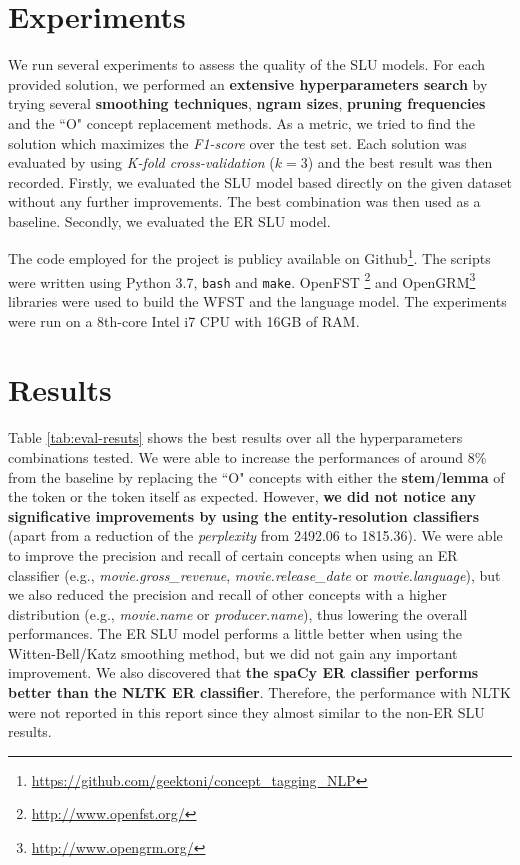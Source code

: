 \documentclass[11pt,a4paper]{article}
\begin{document}
\section{Experiments}

We run several experiments to assess the quality of 
the SLU models. For each provided solution, we performed an \textbf{extensive hyperparameters search} by trying several \textbf{smoothing techniques}, \textbf{ngram sizes}, \textbf{pruning frequencies} and the ``O" concept replacement methods. As a metric, we tried to find the solution which maximizes the \textit{F1-score} over the test set. Each solution was evaluated by using \textit{K-fold cross-validation} ($k=3$) and the best result was then recorded. Firstly, we evaluated the SLU model based directly on the given dataset without any further improvements. The best combination was then used as a baseline. Secondly, we evaluated the ER SLU model. 

The code employed for the project is publicy available on Github\footnote{\url{https://github.com/geektoni/concept\_tagging\_NLP}}. The scripts were written using Python 3.7, \texttt{bash} and \texttt{make}. OpenFST \footnote{\url{http://www.openfst.org/}} and OpenGRM\footnote{\url{http://www.opengrm.org/}} libraries were used to build the WFST and the language model.
The experiments were run on a 8th-core Intel i7 CPU with 16GB of RAM. 



\section{Results}

Table \ref{tab:eval-resuts} shows the best results over all the hyperparameters combinations tested. We were able to increase the performances of around 8\% from the baseline by replacing the ``O" concepts with either the \textbf{stem}/\textbf{lemma} of the token or the token itself as expected.
However, \textbf{we did not notice any significative improvements by using the entity-resolution classifiers} (apart from a reduction of the \textit{perplexity} from 2492.06 to 1815.36).  We were able to improve the precision and recall of certain concepts when using an ER classifier (e.g., \textit{movie.gross\_revenue}, \textit{movie.release\_date} or \textit{movie.language}), but we also reduced the precision and recall of other concepts with a higher distribution (e.g., \textit{movie.name} or \textit{producer.name}), thus lowering the overall performances. The ER SLU model performs a little better when using the Witten-Bell/Katz smoothing method, but we did not gain any important improvement. We also discovered that \textbf{the spaCy ER classifier performs better than the NLTK ER classifier}. 
Therefore, the performance with NLTK were not reported in this report since they almost similar to the non-ER SLU results.
\end{document}
